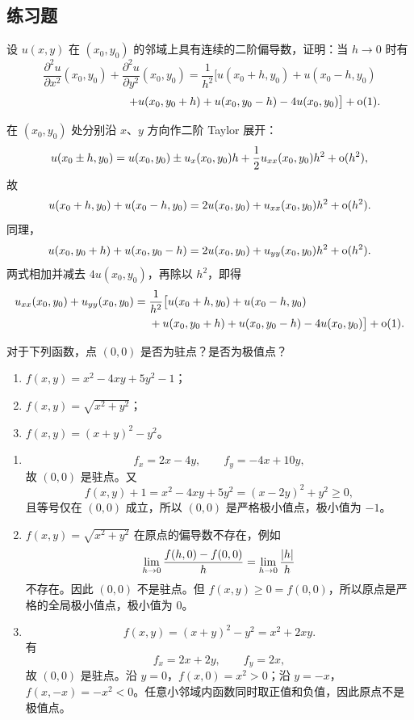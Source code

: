 \subsection{练习题}
\begin{xexercise}[1]
设 $u(x,y)$ 在 $(x_0,y_0)$ 的邻域上具有连续的二阶偏导数，证明：当 $h\to0$ 时有
  \[
    \frac{\partial^2u}{\partial x^2}(x_0,y_0)+\frac{\partial^2u}{\partial y^2}(x_0,y_0)
    =\frac1{h^2}\bigl[u(x_0+h,y_0)+u(x_0-h,y_0)
  \]
  \[
    \qquad\qquad\qquad\qquad
    +u(x_0,y_0+h)+u(x_0,y_0-h)-4u(x_0,y_0)\bigr]+\mathrm{o}(1).
  \]
\end{xexercise}
\begin{xsolution}
在 $(x_0,y_0)$ 处分别沿 $x$、$y$ 方向作二阶 Taylor 展开：
\[
  u(x_0\pm h,y_0)
  =u(x_0,y_0)\pm u_x(x_0,y_0)h
  +\frac12u_{xx}(x_0,y_0)h^2+\mathrm{o}(h^2),
\]
故
\[
  u(x_0+h,y_0)+u(x_0-h,y_0)
  =2u(x_0,y_0)+u_{xx}(x_0,y_0)h^2+\mathrm{o}(h^2).
\]
同理，
\[
  u(x_0,y_0+h)+u(x_0,y_0-h)
  =2u(x_0,y_0)+u_{yy}(x_0,y_0)h^2+\mathrm{o}(h^2).
\]
两式相加并减去 $4u(x_0,y_0)$，再除以 $h^2$，即得
\[
\begin{aligned}
  u_{xx}(x_0,y_0)+u_{yy}(x_0,y_0)
  ={}&\frac1{h^2}\bigl[u(x_0+h,y_0)+u(x_0-h,y_0)\\
  &+u(x_0,y_0+h)+u(x_0,y_0-h)-4u(x_0,y_0)\bigr]
  +\mathrm{o}(1).
\end{aligned}
\]
\end{xsolution}


\begin{xexercise}[2]
对于下列函数，点 $(0,0)$ 是否为驻点？是否为极值点？
  \begin{enumerate}[label=(\arabic*)]
    \item $f(x,y)=x^2-4xy+5y^2-1$；
    \item $f(x,y)=\sqrt{x^2+y^2}$；
    \item $f(x,y)=(x+y)^2-y^2$。
  \end{enumerate}
\end{xexercise}
\begin{xsolution}
\begin{enumerate}[label=(\arabic*)]
  \item
  \[
    f_x=2x-4y,
    \qquad
    f_y=-4x+10y,
  \]
  故 $(0,0)$ 是驻点。又
  \[
    f(x,y)+1=x^2-4xy+5y^2=(x-2y)^2+y^2\ge0,
  \]
  且等号仅在 $(0,0)$ 成立，所以 $(0,0)$ 是严格极小值点，极小值为 $-1$。

  \item $f(x,y)=\sqrt{x^2+y^2}$ 在原点的偏导数不存在，例如
  \[
    \lim_{h\to0}\frac{f(h,0)-f(0,0)}h
    =\lim_{h\to0}\frac{\lvert h\rvert}h
  \]
  不存在。因此 $(0,0)$ 不是驻点。但 $f(x,y)\ge0=f(0,0)$，所以原点是严格的全局极小值点，极小值为 $0$。

  \item
  \[
    f(x,y)=(x+y)^2-y^2=x^2+2xy.
  \]
  有
  \[
    f_x=2x+2y,
    \qquad
    f_y=2x,
  \]
  故 $(0,0)$ 是驻点。沿 $y=0$，$f(x,0)=x^2>0$；沿 $y=-x$，$f(x,-x)=-x^2<0$。任意小邻域内函数同时取正值和负值，因此原点不是极值点。
\end{enumerate}
\end{xsolution}



